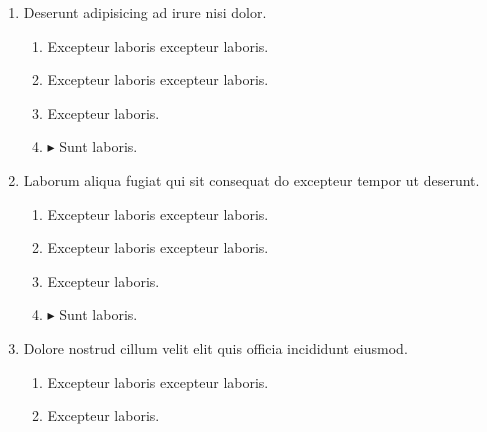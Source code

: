 \documentclass[a4paper,12pt]{article}
\begin{document}
\begin{enumerate}[label=\textbf{\arabic*.}]
\begin{multicols}{2}
\begin{enumerate}
		\item  Excepteur laboris excepteur laboris.
    
		\item  Excepteur laboris.
    
	\end{enumerate}

\end{multicols}
\item Deserunt adipisicing ad irure nisi dolor.
\begin{multicols}{2}
	\begin{enumerate}
		\item  Excepteur laboris excepteur laboris.
    
		\item  Excepteur laboris excepteur laboris.
  
		\item  Excepteur laboris.
    
		\item $\blacktriangleright$  Sunt laboris.
    
	\end{enumerate}

\end{multicols}
\item Laborum aliqua fugiat qui sit consequat do excepteur tempor ut deserunt.
\begin{multicols}{2}
	\begin{enumerate}
		\item  Excepteur laboris excepteur laboris.
    
		\item  Excepteur laboris excepteur laboris.
  
		\item  Excepteur laboris.
    
		\item $\blacktriangleright$  Sunt laboris.
    
	\end{enumerate}

\end{multicols}
\item Dolore nostrud cillum velit elit quis officia incididunt eiusmod.
\begin{multicols}{2}
	\begin{enumerate}
		\item  Excepteur laboris excepteur laboris.
    
		\item  Excepteur laboris.
    

\end{enumerate}
\end{multicols}
\end{enumerate}
\end{document}
